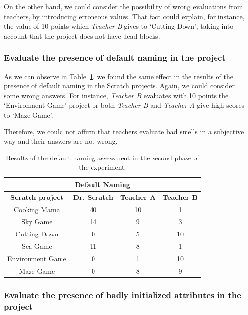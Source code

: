 On the other hand, we could consider the possibility of wrong evaluations from teachers, by introducing erroneous values. That fact could explain, for instance, the value of 10 points which \textit{Teacher B} gives to `Cutting Down', taking into account that the project does not have dead blocks. 


\subsubsection{Evaluate the presence of default naming in the project}
\label{subsubsec:default_naming_experiment}

As we can observe in Table~\ref{table:assessment_experiment_default_naming}, we found the same effect in the results of the presence of default naming in the Scratch projects. Again, we could consider some wrong answers. For instance, \textit{Teacher B} evaluates with 10 points the `Environment Game' project or both \textit{Teacher B} and \textit{Teacher A} give high scores to `Maze Game'. 

Therefore, we could not affirm that teachers evaluate bad smells in a subjective way and their answers are not wrong.  

\begin{table}
    \centering
    \begin{tabular}{|c|c|c|c|}
        \hline
        \multicolumn{4}{|c|}{\textbf{Default Naming}} \\ \hline
        \textbf{Scratch project} & \textbf{Dr. Scratch} & \textbf{Teacher A} & \textbf{Teacher B} \\ \hline
        Cooking Mama  & 40 & 10 & 1  \\ \hline
        Sky Game & 14 & 9 & 3 \\ \hline
        Cutting Down  & 0 & 5 & 10  \\ \hline
        Sea Game  & 11 & 8 & 1  \\ \hline
        Environment Game  & 0 & 1 & 10  \\ \hline
        Maze Game  & 0 & 8 & 9  \\ \hline
    \end{tabular}
    \caption{Results of the default naming assessment in the second phase of the experiment.}
    \label{table:assessment_experiment_default_naming}
\end{table}


\subsubsection{Evaluate the presence of badly initialized attributes in the project}
\label{subsubsec:attribute_initialization_experiment}

